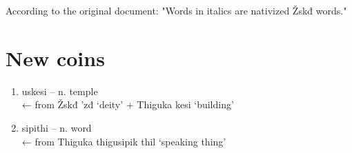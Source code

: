 \documentclass{thiguka}
\begin{document}
According to the original document: "Words in italics are nativized Žskđ words."

\section{New coins}

\begin{enumerate}
\item uskesi -- n. temple \\ ← from Žskđ ’zđ ‘deity’ + Thiguka kesi ‘building’
\item sipithi -- n. word \\ ← from Thiguka thigusipik thil ‘speaking thing’
\end{enumerate}
\end{document}

